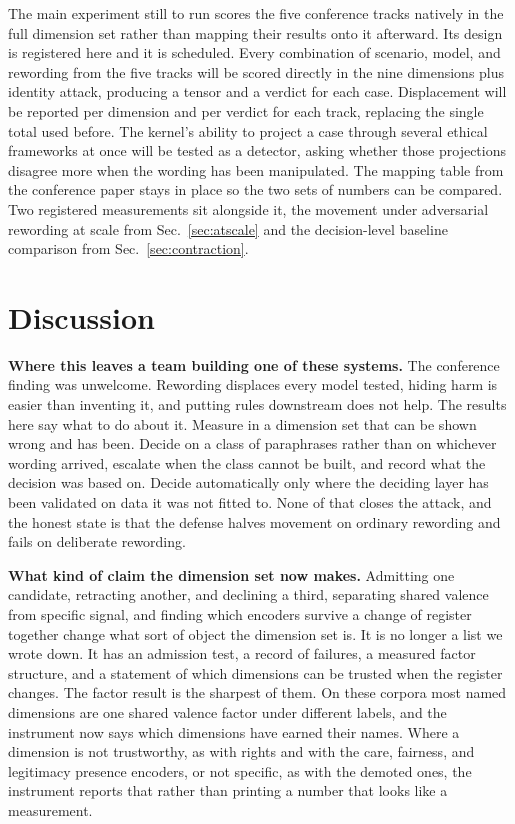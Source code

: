 \documentclass[journal]{IEEEtran}
\begin{document}
The main experiment still to run scores the five conference tracks natively
in the full dimension set rather than mapping their results onto it
afterward. Its design is registered here and it is scheduled. Every
combination of scenario, model, and rewording from the five tracks will be
scored directly in the nine dimensions plus identity attack, producing a
tensor and a verdict for each case. Displacement will be reported per
dimension and per verdict for each track, replacing the single total used
before. The kernel's ability to project a case through several ethical
frameworks at once will be tested as a detector, asking whether those
projections disagree more when the wording has been manipulated. The mapping
table from the conference paper stays in place so the two sets of numbers can
be compared. Two registered measurements sit alongside it, the movement under
adversarial rewording at scale from Sec.~\ref{sec:atscale} and the
decision-level baseline comparison from Sec.~\ref{sec:contraction}.

\section{Discussion}
\label{sec:discussion}

\textbf{Where this leaves a team building one of these systems.} The
conference finding was unwelcome. Rewording displaces every model tested,
hiding harm is easier than inventing it, and putting rules downstream does
not help. The results here say what to do about it. Measure in a dimension
set that can be shown wrong and has been. Decide on a class of paraphrases
rather than on whichever wording arrived, escalate when the class cannot be
built, and record what the decision was based on. Decide automatically only
where the deciding layer has been validated on data it was not fitted to.
None of that closes the attack, and the honest state is that the defense
halves movement on ordinary rewording and fails on deliberate rewording.

\textbf{What kind of claim the dimension set now makes.} Admitting one
candidate, retracting another, and declining a third, separating shared
valence from specific signal, and finding which encoders survive a change of
register together change what sort of object the dimension set is. It is no
longer a list we wrote down. It has an admission test, a record of failures,
a measured factor structure, and a statement of which dimensions can be
trusted when the register changes. The factor result is the sharpest of them.
On these corpora most named dimensions are one shared valence factor under
different labels, and the instrument now says which dimensions have earned
their names. Where a dimension is not trustworthy, as with rights and with
the care, fairness, and legitimacy presence encoders, or not specific, as
with the demoted ones, the instrument reports that rather than printing a
number that looks like a measurement.
\end{document}
